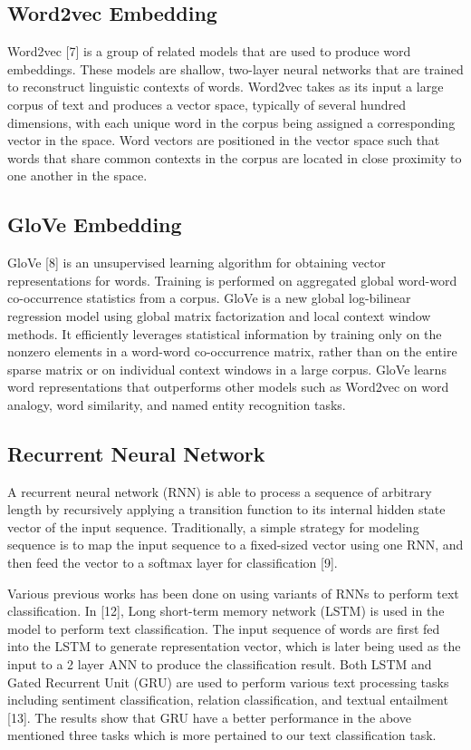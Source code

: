 \documentclass{article}
\begin{document}
\subsection{Word2vec Embedding}
Word2vec [7] is a group of related models that are used to produce word embeddings. These models are shallow, two-layer neural networks that are trained to reconstruct linguistic contexts of words. Word2vec takes as its input a large corpus of text and produces a vector space, typically of several hundred dimensions, with each unique word in the corpus being assigned a corresponding vector in the space. Word vectors are positioned in the vector space such that words that share common contexts in the corpus are located in close proximity to one another in the space.

\subsection{GloVe Embedding}
GloVe [8] is an unsupervised learning algorithm for obtaining vector representations for words. Training is performed on aggregated global word-word co-occurrence statistics from a corpus. GloVe is a new global log-bilinear regression model using global matrix factorization and local context window methods. It  efficiently leverages statistical information by training only on the nonzero elements in a word-word co-occurrence matrix, rather than on the entire sparse matrix or on individual context windows in a large corpus. GloVe learns word representations that outperforms other models such as Word2vec on word analogy, word similarity, and named entity recognition tasks.


\subsection{Recurrent Neural Network}
A recurrent neural network (RNN) is able to process a sequence of arbitrary length by recursively applying a transition function to its internal hidden state vector of the input sequence. Traditionally, a simple strategy for modeling sequence is to map the input sequence to a fixed-sized vector using one RNN, and then feed the vector to a softmax layer for classification [9]. 

Various previous works has been done on using variants of RNNs to perform text classification. In [12], Long short-term memory network (LSTM) is used in the model to perform text classification. The input sequence of words are first fed into the LSTM to generate representation vector, which is later being used as the input to a 2 layer ANN to produce the classification result. Both LSTM and Gated Recurrent Unit (GRU) are used to perform various text processing tasks including sentiment classification, relation classification, and textual entailment [13]. The results show that GRU have a better performance in the above mentioned three tasks which is more pertained to our text classification task. 
\end{document}
